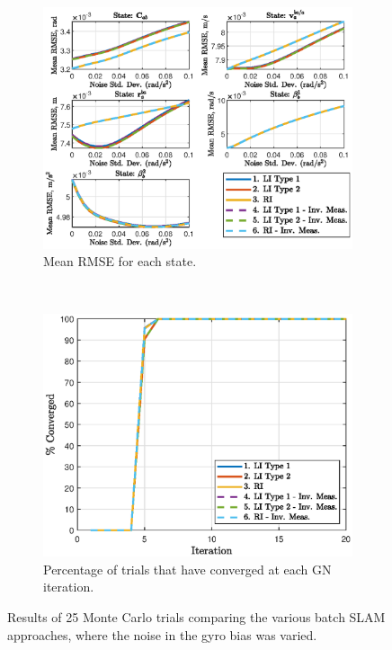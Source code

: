 \begin{figure}
	\centering
	\begin{subfigure}[b]{0.5\textwidth}
		\includegraphics[width=\textwidth]{figs/batch/gyro_bias_rmse.eps}
		\caption{Mean RMSE for each state.}
	\end{subfigure}
	~
	\begin{subfigure}[b]{0.5\textwidth}
		\includegraphics[width=\textwidth]{figs/batch/gyro_bias_perc.eps}
		\caption{Percentage of trials that have converged at each GN iteration.}
	\end{subfigure}
	\caption[Results comparing batch SLAM approaches vvarying rate gyro bias noise.]{Results of 25 Monte Carlo trials comparing the various batch SLAM approaches, where the noise in the gyro bias was varied.}
	\label{fig:batch_gyro_bias}
\end{figure} 


